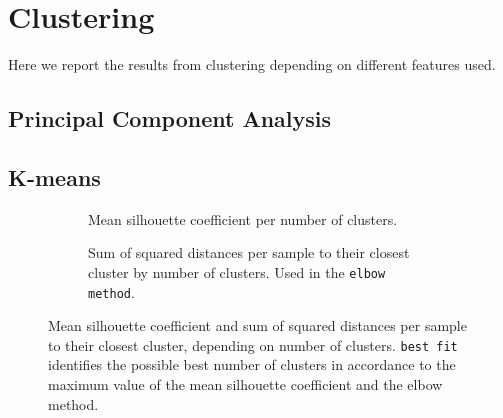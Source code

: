 %


\section{Clustering}
Here we report the results from clustering depending on different features used.



\subsection{Principal Component Analysis}


\subsection{K-means}

\begin{figure}
	\begin{subfigure}[b]{\textwidth}
		
		\caption{Mean silhouette coefficient per number of clusters.}
	\end{subfigure}
	\begin{subfigure}[b]{\textwidth}
		
		\caption{Sum of squared distances per sample to their closest cluster by number of clusters. Used in the \texttt{elbow method}.}
	\end{subfigure}
	\caption{Mean silhouette coefficient and sum of squared distances per sample to their closest cluster, depending on number of clusters. \texttt{best fit} identifies the possible best number of clusters in accordance to the maximum value of the mean silhouette coefficient and the elbow method.}
\end{figure}

